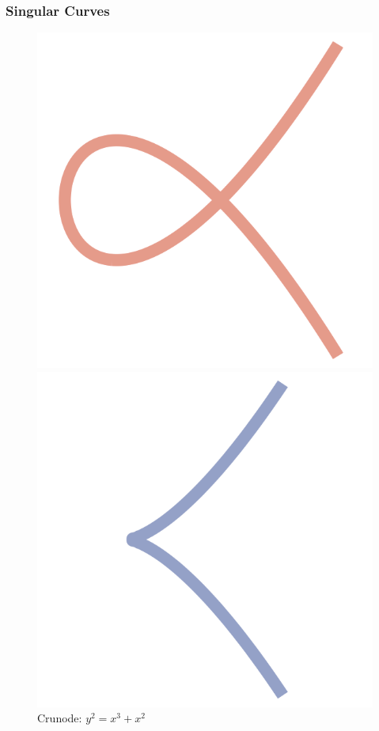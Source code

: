 \documentclass{beamer}
\begin{document}
\begin{frame}
\frametitle{Singular Curves}
\begin{figure}[H]
\begin{minipage}[b]{0.25\linewidth}
\centering
\includegraphics[width=\textwidth]{ch2-singular-node.png}
\caption{Crunode: $y^2=x^3+x^2$}
\label{fig:a}
\end{minipage}
\hspace{0.5cm}
\begin{minipage}[b]{0.25\linewidth}
\centering
\includegraphics[width=\textwidth]{ch2-singular-cusp.png}

\end{minipage}
\end{figure}
\end{frame}
\end{document}
